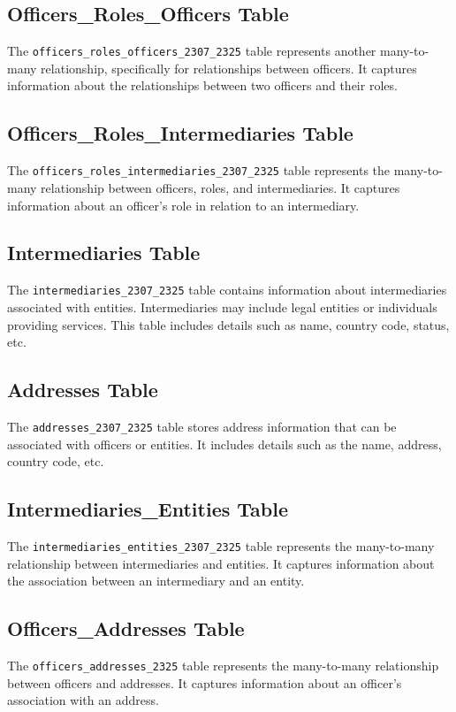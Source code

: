 \documentclass{article}
\begin{document}
\subsection*{Officers\_Roles\_Officers Table}
The \texttt{officers\_roles\_officers\_2307\_2325} table represents another many-to-many relationship, specifically for relationships between officers. It captures information about the relationships between two officers and their roles.

\subsection*{Officers\_Roles\_Intermediaries Table}
The \texttt{officers\_roles\_intermediaries\_2307\_2325} table represents the many-to-many relationship between officers, roles, and intermediaries. It captures information about an officer's role in relation to an intermediary.

\subsection*{Intermediaries Table}
The \texttt{intermediaries\_2307\_2325} table contains information about intermediaries associated with entities. Intermediaries may include legal entities or individuals providing services. This table includes details such as name, country code, status, etc.

\subsection*{Addresses Table}
The \texttt{addresses\_2307\_2325} table stores address information that can be associated with officers or entities. It includes details such as the name, address, country code, etc.

\subsection*{Intermediaries\_Entities Table}
The \texttt{intermediaries\_entities\_2307\_2325} table represents the many-to-many relationship between intermediaries and entities. It captures information about the association between an intermediary and an entity.

\subsection*{Officers\_Addresses Table}
The \texttt{officers\_addresses\_2325} table represents the many-to-many relationship between officers and addresses. It captures information about an officer's association with an address.
\end{document}

